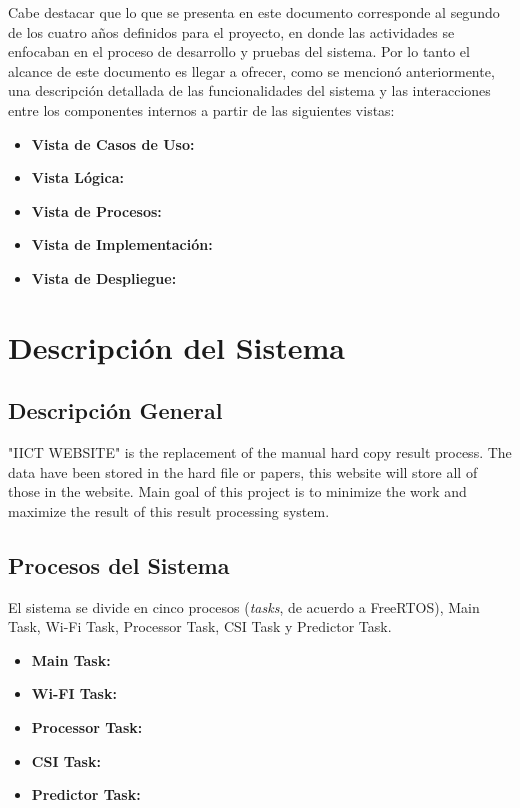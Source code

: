 \documentclass{scrreprt}
\begin{document}
Cabe destacar que lo que se presenta en este documento corresponde al segundo de los cuatro años definidos para el proyecto, en donde las actividades se enfocaban en el proceso de desarrollo y pruebas del sistema. Por lo tanto el alcance de este documento es llegar a ofrecer, como se mencionó anteriormente, una descripción detallada de las funcionalidades del sistema y las interacciones entre los componentes internos a partir de las siguientes vistas: 
\begin{itemize}
    \item \textbf{Vista de Casos de Uso:}
    \item \textbf{Vista Lógica: }
    \item \textbf{Vista de Procesos: }
    \item \textbf{Vista de Implementación: }
    \item \textbf{Vista de Despliegue: }
\end{itemize}

\chapter{Descripción del Sistema}

\section{Descripción General}
"IICT WEBSITE" is the replacement of the manual hard copy result process. The data have been stored in the hard file or papers, this website will store all of those in the website. Main goal of this project is to minimize the work and maximize the result of this result processing system.

\section{Procesos del Sistema }
El sistema se divide en cinco procesos (\emph{tasks}, de acuerdo a FreeRTOS), Main Task, Wi-Fi Task, Processor Task, CSI Task y Predictor Task. 
\begin{itemize}
  \item \textbf{Main Task: }
  \item \textbf{Wi-FI Task: }
  \item \textbf{Processor Task: }
  \item \textbf{CSI Task: }
  \item \textbf{Predictor Task: }
\end{itemize}
\end{document}
